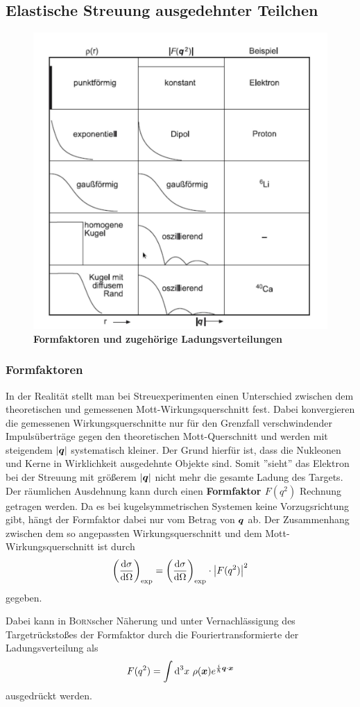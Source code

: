 \subsection{Elastische Streuung ausgedehnter Teilchen}

\begin{figure}
	\centering
	\includegraphics[width=.5\textwidth]{./img/formfaktoren_rho.jpeg}
	\caption{\textbf{Formfaktoren und zugehörige Ladungsverteilungen}}
	\label{fig:formfaktoren}
\end{figure}

\subsubsection{Formfaktoren}
In der Realität stellt man bei Streuexperimenten einen Unterschied zwischen dem theoretischen und gemessenen Mott-Wirkungsquerschnitt fest.
Dabei konvergieren die gemessenen Wirkungsquerschnitte nur für den Grenzfall verschwindender Impulsüberträge gegen den theoretischen Mott-Querschnitt und werden mit steigendem $|\mvec{q}|$ systematisch kleiner.
Der Grund hierfür ist, dass die Nukleonen und Kerne in Wirklichkeit ausgedehnte Objekte sind.
Somit ''sieht'' das Elektron bei der Streuung mit größerem $|\mvec{q}|$ nicht mehr die gesamte Ladung des Targets.
Der räumlichen Ausdehnung kann durch einen \textbf{Formfaktor $F(q^2)$} Rechnung getragen werden.
Da es bei kugelsymmetrischen Systemen keine Vorzugsrichtung gibt, hängt der Formfaktor dabei nur vom Betrag von $\mvec{q}$ ab.
Der Zusammenhang zwischen dem so angepassten Wirkungsquerschnitt und dem Mott-Wirkungsquerschnitt ist durch
\begin{equation*}
	\left(\diff[\sigma]{\Omega}\right)_\text{exp} = \left(\diff[\sigma]{\Omega}\right)_\text{exp}\cdot \left|F(q^2)\right|^2
\end{equation*}
gegeben.

Dabei kann in \textsc{Born}scher Näherung und unter Vernachlässigung des Targetrückstoßes der Formfaktor durch die Fouriertransformierte der Ladungsverteilung als
\begin{equation*}
	F(q^2) = \int{\text{d}^3x\ \rho(\mvec{x})e^{\frac{i}{\hbar}\mvec{q}\cdot\mvec{x}}}
\end{equation*}
ausgedrückt werden.

